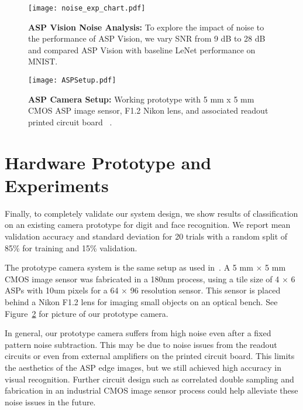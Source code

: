 \documentclass[10pt,twocolumn,letterpaper]{article}
\newcommand{\Section}[1]{\vspace{-4pt}\section{#1}\vspace{-4pt}}
\begin{document}
\begin{figure}[t]
\begin{center}
   \texttt{[image: noise\_exp\_chart.pdf]}
\end{center}
   \caption{\textbf{ASP Vision Noise Analysis:} To explore the impact of noise to the performance of ASP Vision, we vary SNR from 9 dB to 28 dB and compared ASP Vision with baseline LeNet performance on MNIST.}
\label{fig:noisesweep}
\end{figure}

\begin{figure}[t]
\begin{center}
   \texttt{[image: ASPSetup.pdf]}
\end{center}
   \caption{\textbf{ASP Camera Setup:} Working prototype with 5 mm x 5 mm CMOS ASP image sensor, F1.2 Nikon lens, and associated readout printed circuit board ~\cite{hirsch2014switchable, wang2012compression}.}
\label{fig:aspsetup}
\end{figure}

\Section{Hardware Prototype and Experiments}
	Finally, to completely validate our system design, we show results of classification on an existing camera prototype for digit and face recognition. We report mean validation accuracy and standard deviation for 20 trials with a random split of 85\% for training and 15\% validation. 

The prototype camera system is the same setup as used in~\cite{hirsch2014switchable, wang2012compression}.  A 5 mm $\times$ 5 mm CMOS image sensor was fabricated in a 180nm process, using a tile size of 4 $\times$ 6 ASPs with 10um pixels for a 64 $\times$ 96 resolution sensor. This sensor is placed behind a Nikon F1.2 lens for imaging small objects on an optical bench. See Figure~\ref{fig:aspsetup} for picture of our prototype camera.

In general, our prototype camera suffers from high noise even after a fixed pattern noise subtraction. This may be due to noise issues from the readout circuits or even from external amplifiers on the printed circuit board. This limits the aesthetics of the ASP edge images, but we still achieved high accuracy in visual recognition. Further circuit design such as correlated double sampling and fabrication in an industrial CMOS image sensor process could help alleviate these noise issues in the future. 
\end{document}
